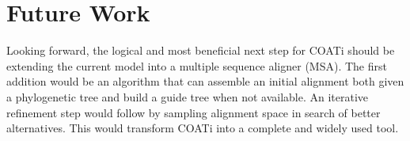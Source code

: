 \section{Future Work}
%
%

Looking forward, the logical and most beneficial next step for COATi should be
extending the current model into a multiple sequence aligner (MSA).
The first addition would be an algorithm that can assemble an initial alignment
both given a phylogenetic tree and build a guide tree when not available.
An iterative refinement step would follow by sampling alignment space in search
of better alternatives.
This would transform COATi into a complete and widely used tool.